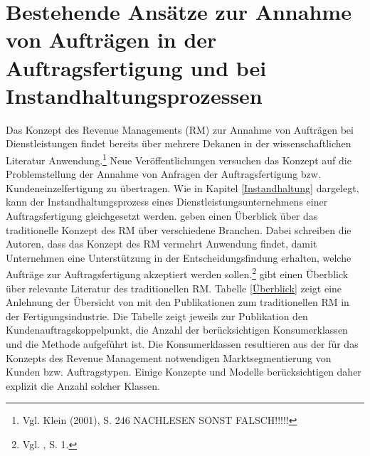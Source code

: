 \chapter{Bestehende Ansätze zur Annahme von Aufträgen in der Auftragsfertigung und bei Instandhaltungsprozessen}\label{Review}
\setcounter{footnote}{4}  %

Das Konzept des Revenue Managements (RM) zur Annahme von Aufträgen bei Dienstleistungen findet bereits über mehrere Dekanen in der wissenschaftlichen Literatur Anwendung.\footnote{Vgl. Klein (2001), S. 246 NACHLESEN SONST FALSCH!!!!!} Neue Veröffentlichungen versuchen das Konzept auf die Problemstellung der Annahme von Anfragen der Auftragsfertigung bzw. Kundeneinzelfertigung zu übertragen. Wie in Kapitel \ref{Instandhaltung} dargelegt, kann der Instandhaltungsprozess eines Dienstleistungsunternehmens einer Auftragsfertigung gleichgesetzt werden. \cite{kimms2005revenue} geben einen Überblick über das traditionelle Konzept des RM über verschiedene Branchen. Dabei schreiben die Autoren, dass das Konzept des RM vermehrt Anwendung findet, damit Unternehmen eine Unterstützung in der Entscheidungsfindung erhalten, welche Aufträge zur Auftragsfertigung akzeptiert werden sollen.\footnote{Vgl. \cite{kimms2005revenue}, S. 1.} \cite{quante2009management} gibt einen Überblick über relevante Literatur des traditionellen RM. Tabelle \ref{Überblick} zeigt eine Anlehnung der Übersicht von \cite{quante2009management} mit den Publikationen zum traditionellen RM in der Fertigungsindustrie. Die Tabelle zeigt jeweils zur Publikation den Kundenauftragskoppelpunkt, die Anzahl der berücksichtigen Konsumerklassen und die Methode aufgeführt ist. Die Konsumerklassen resultieren aus der für das Konzepts des Revenue Management notwendigen Marktsegmentierung von Kunden bzw. Auftragstypen. Einige Konzepte und Modelle berücksichtigen daher explizit die Anzahl solcher Klassen.

